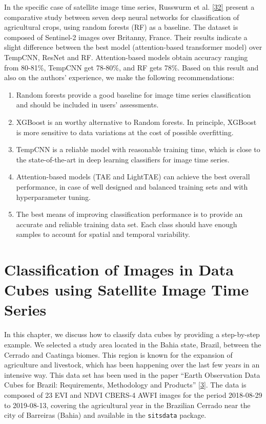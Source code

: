 \documentclass[
  11pt,
]{report}
\newcommand{\passthrough}[1]{#1}
\begin{document}
In the specific case of satellite image time series, Russwurm et al.
\protect\hyperlink{ref-Russwurm2020}{{[}32{]}} present a comparative
study between seven deep neural networks for classification of
agricultural crops, using random forests (RF) as a baseline. The dataset
is composed of Sentinel-2 images over Britanny, France. Their results
indicate a slight difference between the best model (attention-based
transformer model) over TempCNN, ResNet and RF. Attention-based models
obtain accuracy ranging from 80-81\%, TempCNN get 78-80\%, and RF gets
78\%. Based on this result and also on the authors' experience, we make
the following recommendations:

\begin{enumerate}
\def\labelenumi{\arabic{enumi}.}
\item
  Random forests provide a good baseline for image time series
  classification and should be included in users' assessments.
\item
  XGBoost is an worthy alternative to Random forests. In principle,
  XGBoost is more sensitive to data variations at the cost of possible
  overfitting.
\item
  TempCNN is a reliable model with reasonable training time, which is
  close to the state-of-the-art in deep learning classifiers for image
  time series.
\item
  Attention-based models (TAE and LightTAE) can achieve the best overall
  performance, in case of well designed and balanced training sets and
  with hyperparameter tuning.
\item
  The best means of improving classification performance is to provide
  an accurate and reliable training data set. Each class should have
  enough samples to account for spatial and temporal variability.
\end{enumerate}

\hypertarget{classification-of-images-in-data-cubes-using-satellite-image-time-series}{%
\chapter*{Classification of Images in Data Cubes using Satellite Image
Time
Series}\label{classification-of-images-in-data-cubes-using-satellite-image-time-series}}

In this chapter, we discuss how to classify data cubes by providing a
step-by-step example. We selected a study area located in the Bahia
state, Brazil, between the Cerrado and Caatinga biomes. This region is
known for the expansion of agriculture and livestock, which has been
happening over the last few years in an intensive way. This data set has
been used in the paper ``Earth Observation Data Cubes for Brazil:
Requirements, Methodology and Products''
\protect\hyperlink{ref-Ferreira2020a}{{[}3{]}}. The data is composed of
23 EVI and NDVI CBERS-4 AWFI images for the period 2018-08-29 to
2019-08-13, covering the agricultural year in the Brazilian Cerrado near
the city of Barreiras (Bahia) and available in the
\passthrough{\lstinline!sitsdata!} package.
\end{document}
